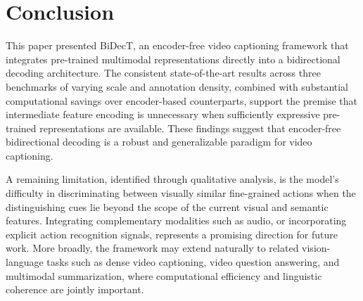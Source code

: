 \section{Conclusion}
\label{sec:06_con}

This paper presented BiDecT, an encoder-free video captioning framework that integrates pre-trained multimodal representations directly into a bidirectional decoding architecture. The consistent state-of-the-art results across three benchmarks of varying scale and annotation density, combined with substantial computational savings over encoder-based counterparts, support the premise that intermediate feature encoding is unnecessary when sufficiently expressive pre-trained representations are available. These findings suggest that encoder-free bidirectional decoding is a robust and generalizable paradigm for video captioning.

A remaining limitation, identified through qualitative analysis, is the model’s difficulty in discriminating between visually similar fine-grained actions when the distinguishing cues lie beyond the scope of the current visual and semantic features. Integrating complementary modalities such as audio, or incorporating explicit action recognition signals, represents a promising direction for future work. More broadly, the framework may extend naturally to related vision-language tasks such as dense video captioning, video question answering, and multimodal summarization, where computational efficiency and linguistic coherence are jointly important.

